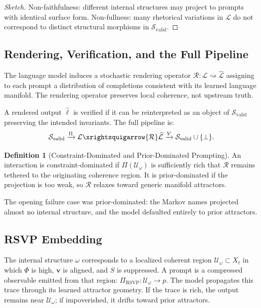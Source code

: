 \documentclass[12pt, a4paper]{article}
\theoremstyle{plain}
\theoremstyle{definition}
\newtheorem{definition}[theorem]{Definition}
\theoremstyle{remark}
\begin{document}
\begin{proof}[Sketch]
Non-faithfulness: different internal structures may project to prompts with identical surface form. Non-fullness: many rhetorical variations in $\mathcal{L}$ do not correspond to distinct structural morphisms in $\mathcal{S}_{\mathrm{valid}}$.
\end{proof}

\subsection{Rendering, Verification, and the Full Pipeline}

The language model induces a stochastic rendering operator $\mathcal{R} : \mathcal{L} \rightsquigarrow \widehat{\mathcal{L}}$ assigning to each prompt a distribution of completions consistent with its learned language manifold. The rendering operator preserves local coherence, not upstream truth.

A rendered output $\hat{\ell}$ is verified if it can be reinterpreted as an object of $\mathcal{S}_{\mathrm{valid}}$ preserving the intended invariants. The full pipeline is:
\[
\mathcal{S}_{\mathrm{valid}}
\xrightarrow{\Pi}
\mathcal{L}
\xrightsquigarrow{\mathcal{R}}
\widehat{\mathcal{L}}
\xrightarrow{\mathcal{V}}
\mathcal{S}_{\mathrm{valid}} \cup \{\bot\}.
\]

\begin{definition}[Constraint-Dominated and Prior-Dominated Prompting]
An interaction is constraint-dominated if $\Pi(\mathcal{U}_\omega)$ is sufficiently rich that $\mathcal{R}$ remains tethered to the originating coherence region. It is prior-dominated if the projection is too weak, so $\mathcal{R}$ relaxes toward generic manifold attractors.
\end{definition}

The opening failure case was prior-dominated: the Markov names projected almost no internal structure, and the model defaulted entirely to prior attractors.

\subsection{RSVP Embedding}

The internal structure $\omega$ corresponds to a localized coherent region $\mathcal{U}_\omega \subset X_t$ in which $\Phi$ is high, $\mathbf{v}$ is aligned, and $S$ is suppressed. A prompt is a compressed observable emitted from that region: $\Pi_{\mathrm{RSVP}} : \mathcal{U}_\omega \to p$. The model propagates this trace through its learned attractor geometry. If the trace is rich, the output remains near $\mathcal{U}_\omega$; if impoverished, it drifts toward prior attractors.
\end{document}
